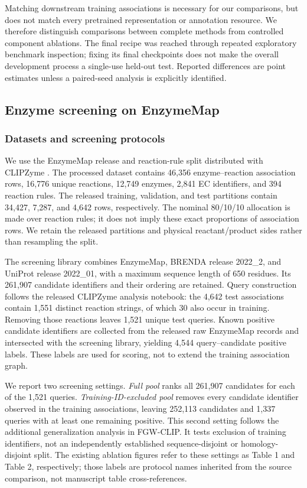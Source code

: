 Matching downstream training associations is necessary for our comparisons,
but does not match every pretrained representation or annotation resource.
We therefore distinguish comparisons between complete methods from controlled
component ablations. The final recipe was reached through repeated exploratory
benchmark inspection; fixing its final checkpoints does not make the overall
development process a single-use held-out test. Reported differences are point
estimates unless a paired-seed analysis is explicitly identified.

\subsection{Enzyme screening on EnzymeMap}
\label{sec:exp-screening}
\subsubsection{Datasets and screening protocols}

We use the EnzymeMap release and reaction-rule split distributed with
CLIPZyme \citep{heid2023enzymemap,mikhael2024clipzyme}. The processed dataset
contains 46,356 enzyme--reaction association rows, 16,776 unique reactions,
12,749 enzymes, 2,841 EC identifiers, and 394 reaction rules. The released
training, validation, and test partitions contain 34,427, 7,287, and 4,642
rows, respectively. The nominal 80/10/10 allocation is made over reaction
rules; it does not imply these exact proportions of association rows. We
retain the released partitions and physical reactant/product sides rather
than resampling the split.

The screening library combines EnzymeMap, BRENDA release 2022\_2, and UniProt
release 2022\_01, with a maximum sequence length of 650 residues. Its 261,907
candidate identifiers and their ordering are retained. Query construction
follows the released CLIPZyme analysis notebook: the 4,642 test associations
contain 1,551 distinct reaction strings, of which 30 also occur in training.
Removing those reactions leaves 1,521 unique test queries. Known positive
candidate identifiers are collected from the released raw EnzymeMap records
and intersected with the screening library, yielding 4,544 query--candidate
positive labels. These labels are used for scoring, not to extend the training
association graph.

We report two screening settings. \emph{Full pool} ranks all 261,907 candidates
for each of the 1,521 queries. \emph{Training-ID-excluded pool} removes every
candidate identifier observed in the training associations, leaving 252,113
candidates and 1,337 queries with at least one remaining positive. This second
setting follows the additional generalization analysis in FGW-CLIP. It tests
exclusion of training identifiers, not an independently established
sequence-disjoint or homology-disjoint split. The existing ablation figures
refer to these settings as Table 1 and Table 2, respectively; those labels are
protocol names inherited from the source comparison, not manuscript table
cross-references.

